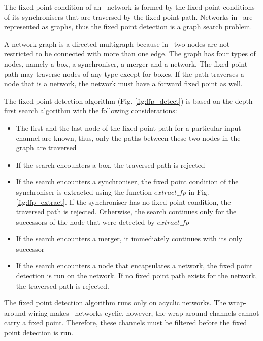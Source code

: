 The fixed point condition of an \ak\ network is formed by the fixed point conditions of its synchronisers that are traversed by the fixed point path. Networks in \ak\ are represented as graphs, thus the fixed point detection is a graph search problem.

A network graph is a directed multigraph because in \ak\ two nodes are not restricted to be connected with more than one edge. The graph has four types of nodes, namely a box, a synchroniser, a merger and a network. The fixed point path may traverse nodes of any type except for boxes. If the path traverses a node that is a network, the network must have a forward fixed point as well.

The fixed point detection algorithm (Fig. \ref{fig:ffp_detect}) is based on the depth-first search algorithm with the following considerations:
\begin{itemize}
\item The first and the last node of the fixed point path for a particular input channel are known, thus, only the paths between these two nodes in the graph are traversed

\item If the search encounters a box, the traversed path is rejected

\item If the search encounters a synchroniser, the fixed point condition of the synchroniser is extracted using the function $extract\_fp$ in Fig. \ref{fig:ffp_extract}. If the synchroniser has no fixed point condition, the traversed path is rejected. Otherwise, the search continues only for the successors of the node that were detected by $extract\_fp$

\item If the search encounters a merger, it immediately continues with its only successor

\item If the search encounters a node that encapsulates a network, the fixed point detection is run on the network. If no fixed point path exists for the network, the traversed path is rejected.
\end{itemize}

The fixed point detection algorithm runs only on acyclic networks. The wrap-around wiring makes \ak\ networks cyclic, however, the wrap-around channels cannot carry a fixed point. Therefore, these channels must be filtered before the fixed point detection is run.


